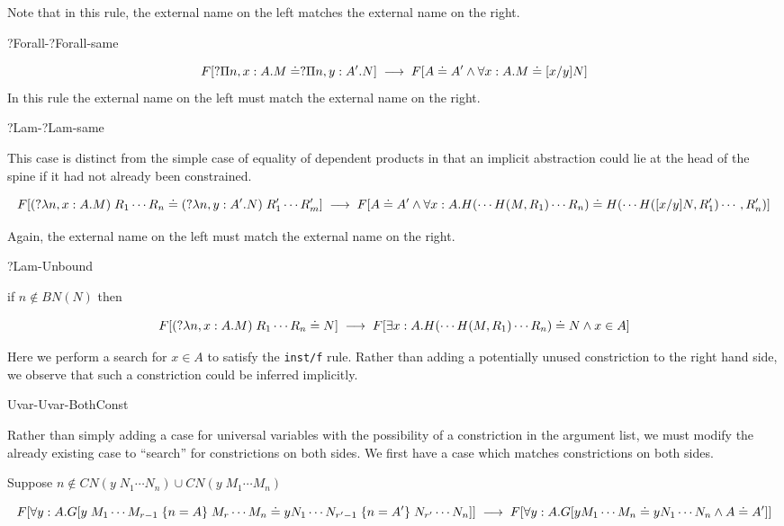 Note that in this rule, the external name on the left matches the external name on the right.


\begin{tcase}
?Forall-?Forall-same
\end{tcase}

\[
F[?\Pi n,x : A . M \doteq ?\Pi n,y : A' . N ]
\;\longrightarrow\;
F[ A \doteq A' \wedge \forall x : A . M \doteq [x/y]N ]
\]
In this rule the external name on the left must match the external name on the right.


\begin{tcase}
?Lam-?Lam-same
\end{tcase}

This case is distinct from the simple case of equality of dependent products in that an implicit abstraction could lie at the head of 
the spine if it had not already been constrained.

\[
F[(?\lambda n,x : A . M) \; R_1 \cdots R_n \doteq (?\lambda n,y : A' . N) \; R'_1 \cdots R'_m]
\;\longrightarrow\;
F[ A \doteq A' \wedge \forall x : A . H(\cdots H(M, R_1)\cdots R_n)  \doteq H(\cdots H([x/y]N, R'_1)\cdots , R'_n) ]
\]

Again, the external name on the left must match the external name on the right.


\begin{tcase}
?Lam-Unbound
\end{tcase}

if $n \notin BN(N)$ then

\[
F[(?\lambda n,x : A . M) \; R_1 \cdots R_n  \doteq N ]
\;\longrightarrow\;
F[ \exists x : A . H(\cdots H(M, R_1)\cdots R_n) \doteq N \wedge x \in A ]
\]

Here we perform a search for $x \in A$ to satisfy the \verb|inst/f| rule.  Rather than adding a potentially unused constriction to the right hand side, 
we observe that such a constriction could be inferred implicitly.

\begin{tcase}
Uvar-Uvar-BothConst
\end{tcase}

Rather than simply adding a case for universal variables with the possibility of a constriction in the argument list, 
we must modify the already existing case to ``search'' for constrictions on both sides.  
We first have a case which matches constrictions on both sides.

Suppose $n\notin CN(y \; N_1 \cdots N_n) \cup CN(y \; M_1 \cdots M_n)$

\[
F[\forall y : A . G[y \; M_1 \cdots M_{r-1} \;\{ n = A \} \; M_{r} \cdots M_n \doteq y N_1 \cdots N_{r'-1} \; \{ n = A' \} \; N_{r'} \cdots N_n  ]]
\;\longrightarrow\;
F[\forall y : A . G[y M_1 \cdots M_n \doteq y N_1 \cdots N_n \wedge A \doteq A' ]]
\]


